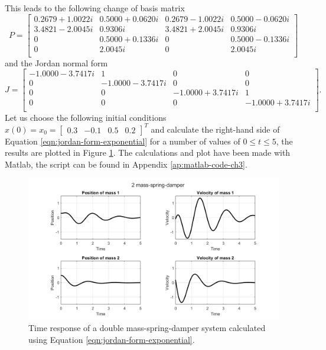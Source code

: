 \begin{example}
\begin{table}[H]
        \label{tab:eigen-example-system}
    \end{table}
    This leads to the following change of basis matrix
    \begin{equation*}
        P = 
        \begin{bmatrix}
            0.2679 + 1.0022i & 0.5000 + 0.0620i &  0.2679 - 1.0022i &  0.5000 - 0.0620i \\
            3.4821 - 2.0045i  & 0.9306i &  3.4821 + 2.0045i & 0.9306i \\
            0&  0.5000 + 0.1336i  & 0  &  0.5000 - 0.1336i \\
            0 &  2.0045i &  0 & 2.0045i \\
        \end{bmatrix}
    \end{equation*}
    and the Jordan normal form
    \begin{equation*}
        J =
        \begin{bmatrix}
            -1.0000 - 3.7417i &  1 &  0 &   0 \\
            0 & -1.0000 - 3.7417i &  0 &  0 \\
            0 &  0 & -1.0000 + 3.7417i  & 1 \\
            0 &  0 &  0 & -1.0000 + 3.7417i \\
        \end{bmatrix}.
    \end{equation*}
    Let us choose the following initial conditions $x(0)=x_0=\begin{bmatrix}
        0.3 & -0.1 & 0.5 & 0.2 
    \end{bmatrix}^T$ and calculate the right-hand side of Equation \eqref{eqn:jordan-form-exponential} for a number of values of $0\leq t \leq 5$, the results are plotted in Figure \ref{fig:system-response}. The calculations and plot have been made with Matlab, the script can be found in Appendix \ref{ap:matlab-code-ch3}.
    \begin{figure}[H]
        \centering
        \includegraphics[width=0.9\linewidth]{report/Figures/system-response.png}
        \caption{Time response of a double mass-spring-damper system calculated using Equation \eqref{eqn:jordan-form-exponential}.}
        \label{fig:system-response}
    \end{figure}
\end{example}


